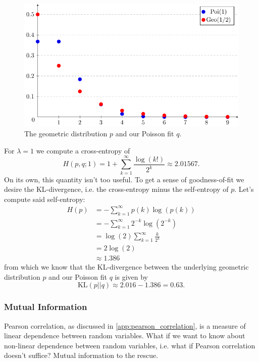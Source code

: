 \documentclass[11pt]{article}
\begin{document}
\begin{appendices}
\begin{figure}[t]
    \centering
    \includegraphics[width=\columnwidth]{./figures/appendix/poi_geo_plot.pdf}
    \caption{The geometric distribution $p$ and our Poisson fit $q$.}
    \label{fig:poi_geo_plot}
\end{figure}

For $\lambda=1$ we compute a cross-entropy of
$$
H(p,q;1)
=
1+\sum_{k=1}^{\infty}\frac{\log(k!)}{2^k}
\approx
2.01567.
$$
On its own, this quantity isn't too useful. To get a sense of goodness-of-fit we desire the KL-divergence, i.e. the cross-entropy minus the self-entropy of $p$. Let's compute said self-entropy:
\begin{align*}
    H(p)
    &=
    -\sum_{k=1}^{\infty}p(k)\log(p(k))\\
    &=
    -\sum_{k=1}^{\infty}2^{-k}\log(2^{-k})\\
    &=
    \log(2)\sum_{k=1}^{\infty}\frac{k}{2^k}\\
    &=
    2\log(2)\\
    &\approx
    1.386
\end{align*}
from which we know that the KL-divergence between the underlying geometric distribution $p$ and our Poisson fit $q$ is given by
$$
\text{KL}(p||q)
\approx
2.016-1.386
=
0.63.
$$

\subsubsection{Mutual Information}
\TODO{} Pearson correlation, as discussed in \autoref{app:pearson_correlation}, is a measure of linear dependence between random variables. What if we want to know about non-linear dependence between random variables, i.e. what if Pearson correlation doesn't suffice? Mutual information to the rescue.


\end{appendices}
\end{document}
